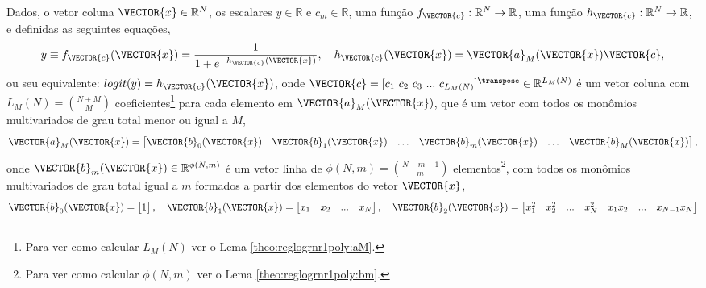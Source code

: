 
\begin{myproofT}\label{proof:theo:reglogrnr1poly}
Dados,
o vetor coluna $\VECTOR{x} \in \mathbb{R}^{N}$, os escalares $y \in \mathbb{R}$ e $c_m \in \mathbb{R}$,
uma função $f_{\VECTOR{c}}:\mathbb{R}^{N} \rightarrow \mathbb{R}$, 
uma função $h_{\VECTOR{c}}:\mathbb{R}^{N} \rightarrow \mathbb{R}$,  e 
definidas as seguintes equações,
\begin{equation}\label{eq:proof:theo:reglogrnr1poly:1}
y\equiv f_{\VECTOR{c}}(\VECTOR{x})= \frac{1}{1+e^{-h_{\VECTOR{c}}(\VECTOR{x}) }},
\quad h_{\VECTOR{c}}(\VECTOR{x}) =  \VECTOR{a}_M(\VECTOR{x})\VECTOR{c},
\end{equation}
ou seu equivalente: $logit(y)=h_{\VECTOR{c}}(\VECTOR{x})$,
onde $\VECTOR{c}=[c_1~ c_2~ c_3~  ...~ c_{L_M(N)}]^{\transpose} \in \mathbb{R}^{L_M(N)}$ é um vetor coluna
com $L_M(N)=\binom{N+M}{M}$ coeficientes\footnote{Para ver como calcular $L_M(N)$ ver o Lema \ref{theo:reglogrnr1poly:aM}.} 
para cada elemento em
$\VECTOR{a}_M(\VECTOR{x})$, que  é um vetor com todos os monômios multivariados de grau total menor ou igual a $M$,
\begin{equation}\label{eq:proof:theo:reglogrnr1poly:2}
\VECTOR{a}_M(\VECTOR{x})=
\begin{bmatrix}
\VECTOR{b}_0(\VECTOR{x}) &
\VECTOR{b}_1(\VECTOR{x}) &
\hdots &
\VECTOR{b}_m(\VECTOR{x}) &
\hdots &
\VECTOR{b}_M(\VECTOR{x}) 
\end{bmatrix},
\end{equation}
onde $\VECTOR{b}_m(\VECTOR{x}) \in \mathbb{R}^{\phi(N,m)}$ é um vetor linha 
de $\phi(N,m)=\binom{N+m-1}{m}$ elementos\footnote{Para ver como calcular $\phi(N,m)$ ver o Lema \ref{theo:reglogrnr1poly:bm}.},
com todos os monômios multivariados de grau total igual a $m$
formados a partir dos elementos do vetor $\VECTOR{x}$,
\begin{equation}\label{eq:proof:theo:reglogrnr1poly:3}
\VECTOR{b}_0(\VECTOR{x})=
\begin{bmatrix}
1 
\end{bmatrix},
\quad 
\VECTOR{b}_1(\VECTOR{x})=
\begin{bmatrix}
x_1 & x_2 & ... &  x_N
\end{bmatrix},
\quad 
\VECTOR{b}_2(\VECTOR{x})=
\begin{bmatrix}
x_1^2 & x_2^2 & ... &  x_N^2 & x_1 x_2 &  ... & x_{N-1} x_N

\end{bmatrix}
\end{equation}
\end{myproofT}
